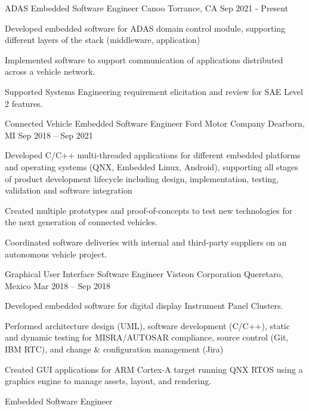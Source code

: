 \documentclass[]{awesome-cv}
\begin{document}
\vspace{-7mm}
\begin{cventries}
	\cventry
	{ADAS Embedded Software Engineer}
	{Canoo}
	{Torrance, CA}
	{Sep 2021 - Present}
	{\begin{cvitems}
		\item {Developed embedded software for ADAS domain control module, supporting different layers of the stack (middleware, application)}
		\item {Implemented software to support communication of applications distributed across a vehicle network.}
		\item {Supported Systems Engineering requirement elicitation and review for SAE Level 2 features.}
		\end{cvitems}}
	\cventry
	{Connected Vehicle Embedded Software Engineer}
	{Ford Motor Company}
	{Dearborn, MI}
	{Sep 2018 – Sep 2021}
	{\begin{cvitems}
		\item {Developed C/C++ multi-threaded applications for different embedded platforms and operating systems (QNX, Embedded Linux, Android), supporting all stages of product development lifecycle including design, implementation, testing, validation and software integration}
		\item {Created multiple prototypes and proof-of-concepts to test new technologies for the next generation of connected vehicles.}
		\item {Coordinated software deliveries with internal and third-party suppliers on an autonomous vehicle project.}
		\end{cvitems}}
	\cventry
	{Graphical User Interface Software Engineer}
	{Visteon Corporation}
	{Queretaro, Mexico}
	{Mar 2018 – Sep 2018}
	{\begin{cvitems}
		\item {Developed embedded software for digital display Instrument Panel Clusters.}
		\item {Performed architecture design (UML), software development (C/C++), static and dynamic testing for MISRA/AUTOSAR compliance, source control (Git, IBM RTC), and change \& configuration management (Jira)}
		\item {Created GUI applications for ARM Cortex-A target running QNX RTOS using a graphics engine to manage assets, layout, and rendering.}
		\end{cvitems}}
	\cventry
	{Embedded Software Engineer}

\end{cventries}
\end{document}
